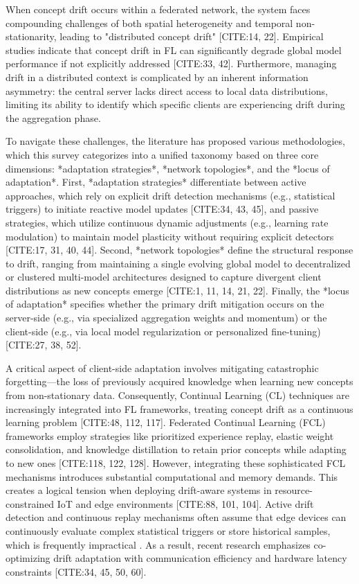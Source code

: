 \documentclass[journal]{IEEEtran}
\begin{document}
When concept drift occurs within a federated network, the system faces compounding challenges of both spatial heterogeneity and temporal non-stationarity, leading to "distributed concept drift" [CITE:14, 22]. Empirical studies indicate that concept drift in FL can significantly degrade global model performance if not explicitly addressed [CITE:33, 42]. Furthermore, managing drift in a distributed context is complicated by an inherent information asymmetry: the central server lacks direct access to local data distributions, limiting its ability to identify which specific clients are experiencing drift during the aggregation phase.

To navigate these challenges, the literature has proposed various methodologies, which this survey categorizes into a unified taxonomy based on three core dimensions: *adaptation strategies*, *network topologies*, and the *locus of adaptation*. First, *adaptation strategies* differentiate between active approaches, which rely on explicit drift detection mechanisms (e.g., statistical triggers) to initiate reactive model updates [CITE:34, 43, 45], and passive strategies, which utilize continuous dynamic adjustments (e.g., learning rate modulation) to maintain model plasticity without requiring explicit detectors [CITE:17, 31, 40, 44]. Second, *network topologies* define the structural response to drift, ranging from maintaining a single evolving global model to decentralized or clustered multi-model architectures designed to capture divergent client distributions as new concepts emerge [CITE:1, 11, 14, 21, 22]. Finally, the *locus of adaptation* specifies whether the primary drift mitigation occurs on the server-side (e.g., via specialized aggregation weights and momentum) or the client-side (e.g., via local model regularization or personalized fine-tuning) [CITE:27, 38, 52].

A critical aspect of client-side adaptation involves mitigating catastrophic forgetting—the loss of previously acquired knowledge when learning new concepts from non-stationary data. Consequently, Continual Learning (CL) techniques are increasingly integrated into FL frameworks, treating concept drift as a continuous learning problem [CITE:48, 112, 117]. Federated Continual Learning (FCL) frameworks employ strategies like prioritized experience replay, elastic weight consolidation, and knowledge distillation to retain prior concepts while adapting to new ones [CITE:118, 122, 128]. However, integrating these sophisticated FCL mechanisms introduces substantial computational and memory demands. This creates a logical tension when deploying drift-aware systems in resource-constrained IoT and edge environments [CITE:88, 101, 104]. Active drift detection and continuous replay mechanisms often assume that edge devices can continuously evaluate complex statistical triggers or store historical samples, which is frequently impractical \cite{ren2025}. As a result, recent research emphasizes co-optimizing drift adaptation with communication efficiency and hardware latency constraints [CITE:34, 45, 50, 60].
\end{document}
